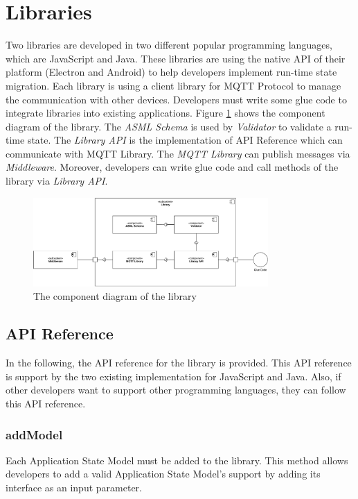 \section{Libraries}
Two libraries are developed in two different popular programming languages, which are JavaScript and Java. These libraries are using the native API of their platform (Electron and Android) to help developers implement run-time state migration. Each library is using a client library for MQTT Protocol to manage the communication with other devices. Developers must write some glue code to integrate libraries into existing applications. Figure \ref{fig:libraries-component} shows the component diagram of the library. The \textit{ASML Schema} is used by \textit{Validator} to validate a run-time state. The \textit{Library API} is the implementation of API Reference which can communicate with MQTT Library. The \textit{MQTT Library} can publish messages via \textit{Middleware}. Moreover, developers can write glue code and call methods of the library via \textit{Library API}.

\FloatBarrier
\begin{figure}[H]
    \includegraphics[width=0.8\textwidth]{../figures/libraries-diagram.pdf}
    \centering
    \caption{The component diagram of the library}
    \label{fig:libraries-component}
\end{figure}
\FloatBarrier

\subsection{API Reference}
In the following, the API reference for the library is provided. This API reference is support by the two existing implementation for JavaScript and Java. Also, if other developers want to support other programming languages, they can follow this API reference. 

\subsubsection{addModel}
Each Application State Model must be added to the library. This method allows developers to add a valid Application State Model's support by adding its interface as an input parameter.

